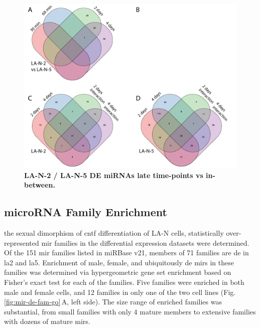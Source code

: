 \begin{figure}
\centering
\includegraphics[width=\textwidth]{figures/la2-vs-la5-overlap-venn}
\caption[LA-N-2 / LA-N-5 DE miRNAs late time points vs in-between.]{\textbf{LA-N-2 / LA-N-5 DE miRNAs late time-points vs in-between.}
\label{fig:la2-vs-la5-overlap-venn}}
\end{figure}

\subsection{microRNA Family Enrichment}
 the sexual dimorphism of \ac{cntf} differentiation of LA-N cells, statistically over-represented \ac{mir} families in the differential expression datasets were determined. Of the 151 \ac{mir} families listed in miRBase v21, members of 71 families are \ac{de} in \ac{la2} and \ac{la5}. Enrichment of male, female, and ubiquitously \ac{de} \acp{mir} in these families was determined via hypergeometric gene set enrichment based on Fisher's exact test for each of the families. Five families were enriched in both male and female cells, and 12 families in only one of the two cell lines (Fig.\,\ref{fig:mir-de-fam-go}\,A, left side). The size range of enriched families was substantial, from small families with only 4 mature members to extensive families with dozens of mature \acp{mir}. 

